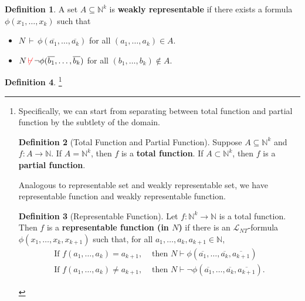 \documentclass[11pt,letterpaper]{book}
\theoremstyle{definition}
\newtheorem{definition}{Definition}[section]
\begin{document}
\begin{definition}
\label{def:weakly_reprsentable_set}
A set $A \subseteq \mathbb{N}^k$ is \textbf{weakly representable} if there exists a formula $\phi(x_1, \ldots, x_k)$ such that
\begin{itemize}
\item{$ N \,  \vdash \, \phi(\overline{a_1}, \ldots, \overline{a_k})$ for all $(a_1, \ldots, a_k) \in A $.}
\item{$ N \,  {\color{red} \not \vdash} \, \lnot \phi (\overline{b_1}, \ldots, \overline{b_k})$ for all $ (b_1, \ldots, b_k) \not \in A $.}
\end{itemize}

\end{definition}

\begin{definition}
\label{def:definable_representable_function}
\footnote{Specifically, we can start from separating between total function and partial function by the subtlety of the domain.

\begin{definition}[Total Function and Partial Function]
Suppose $A \subseteq \mathbb{N}^k$ and $f: A \rightarrow \mathbb{N}$. If
$A = \mathbb{N}^k$, then $f$ is a \textbf{total function}. If $A \subset
\mathbb{N}^k$, then $f$ is a \textbf{partial function}.
\end{definition}


Analogous to representable set and weakly representable set, we have
representable function and weakly representable function.


\begin{definition}[Representable Function]
Let $f: \mathbb{N}^k \rightarrow \mathbb{N}$ is a total function. Then
$f$ is a \textbf{representable function (in $N$)} if there is an
$\mathcal{L}_{NT}$-formula $\phi( x_1, \ldots, x_{k}, x_{k+1} )$ such
that, for all $a_1, \ldots, a_k, a_{k+1} \in \mathbb{N}$,
\begin{equation}
\begin{array}{ll}
\text{If } f(a_1, \ldots, a_k) = a_{k+1}, & \text{ then } N \vdash
\phi(\overline{a_1},  \ldots, \overline{a_k},\overline{a_{k+1}}) \\
\text{If } f(a_1, \ldots, a_k) \neq a_{k+1}, & \text{ then } N \vdash
\lnot \phi(\overline{a_1},  \ldots, \overline{a_k}, \overline{a_{k+1}}).
\end{array}\nonumber
\end{equation}
\end{definition}


}
\end{definition}
\end{document}

